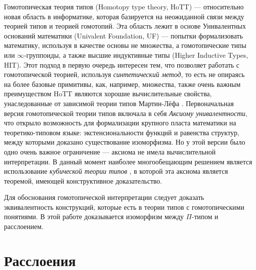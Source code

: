 







\Intro

Гомотопическая теория типов (Homotopy type theory, HoTT) \autocite{hottbook} --- относительно новая область в информатике, которая базируется на неожиданной связи между теорией типов и теорией гомотопий. Эта область лежит в основе Унивалентных оснований математики (Univalent Foundation, UF) \autocite{UFP2010} --- попытки формализовать математику, используя в качестве основы не множества, а гомотопические типы или $\infty$-группоиды, а также высшие индуктивные типы (Higher Inductive Types, HIT). Этот подход в первую очередь интересен тем, что позволяет работать с гомотопической теорией, используя \textit{синтетический метод}, то есть не опираясь на более базовые примитивы, как, например, множества, также очень важным преимуществом HoTT являются хорошие вычислительные свойства, унаследованные от зависимой теории типов Мартин-Лёфа \autocite{MLTT}. Первоначальная версия гомотопической теории типов включала в себя \textit{Аксиому унивалентности}, что открыло возможность для формализации крупного пласта математики на теоретико-типовом языке: экстенсиональности функций и равенства структур, между которыми доказано существование изоморфизма. Но у этой версии было одно очень важное ограничение --- аксиома не имела вычислительной интерпретации. В данный момент наиболее многообещающим решением является использование \textit{кубической теории типов} \autocite{CohenCHM16}, в которой эта аксиома является теоремой, имеющей конструктивное доказательство.

Для обоснования гомотопической интерпретации следует доказать эквивалентность конструкций, которые есть в теории типов с гомотопическими понятиями. В этой работе доказывается изоморфизм между $\Pi$-типом и расслоением.


\section{Расслоения}
\label{sec:fiberbundles}

